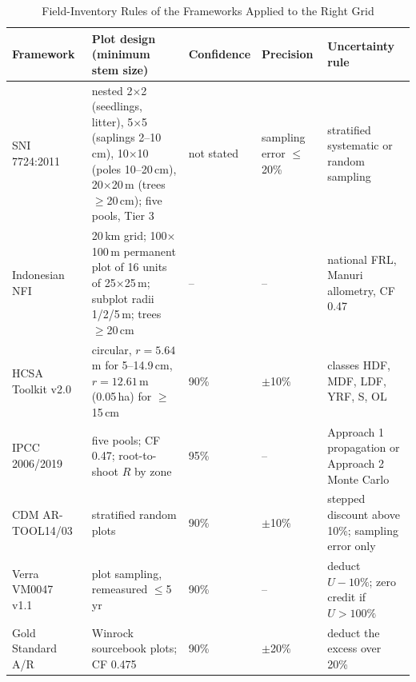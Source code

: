 \documentclass[conference,a4paper]{IEEEtran}
\begin{document}
\begin{table}[t]
\centering
\caption{Field-Inventory Rules of the Frameworks Applied to the Right Grid}
\label{tab:standards}
\footnotesize
\setlength{\tabcolsep}{4pt}
\begin{tabularx}{\textwidth}{@{}l X l l X@{}}
\toprule
\textbf{Framework} & \textbf{Plot design (minimum stem size)} & \textbf{Confidence} & \textbf{Precision} & \textbf{Uncertainty rule}\\
\midrule
SNI 7724:2011~\cite{sni7724} & nested 2$\times$2 (seedlings, litter), 5$\times$5 (saplings 2--10\,cm), 10$\times$10 (poles 10--20\,cm), 20$\times$20\,m (trees $\geq$20\,cm); five pools, Tier 3 & not stated & sampling error $\leq$20\% & stratified systematic or random sampling\\
Indonesian NFI~\cite{klhk2022frl} & 20\,km grid; 100$\times$100\,m permanent plot of 16 units of 25$\times$25\,m; subplot radii 1/2/5\,m; trees $\geq$20\,cm & -- & -- & national FRL, Manuri allometry, CF 0.47\\
HCSA Toolkit v2.0~\cite{rosoman2017hcsa} & circular, $r=5.64$\,m for 5--14.9\,cm, $r=12.61$\,m (0.05\,ha) for $\geq$15\,cm & 90\% & $\pm$10\% & classes HDF, MDF, LDF, YRF, S, OL\\
IPCC 2006/2019~\cite{ipcc2006v4,ipcc2019v4,ipcc2006v1} & five pools; CF 0.47; root-to-shoot $R$ by zone & 95\% & -- & Approach 1 propagation or Approach 2 Monte Carlo\\
CDM AR-TOOL14/03~\cite{artool14,artool03} & stratified random plots & 90\% & $\pm$10\% & stepped discount above 10\%; sampling error only\\
Verra VM0047 v1.1~\cite{verra2025vm0047} & plot sampling, remeasured $\leq$5\,yr & 90\% & -- & deduct $U-10\%$; zero credit if $U>100\%$\\
Gold Standard A/R~\cite{gs2024ar} & Winrock sourcebook plots; CF 0.475 & 90\% & $\pm$20\% & deduct the excess over 20\%\\
\bottomrule
\end{tabularx}
\end{table}
\end{document}
